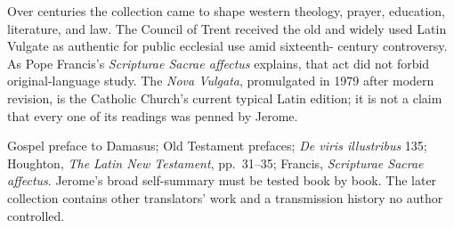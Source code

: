 Over centuries the collection came to shape western theology, prayer,
education, literature, and law. The Council of Trent received the old and
widely used Latin Vulgate as authentic for public ecclesial use amid sixteenth-
century controversy. As Pope Francis's \emph{Scripturae Sacrae affectus}
explains, that act did not forbid original-language study. The \emph{Nova
Vulgata}, promulgated in 1979 after modern revision, is the Catholic Church's
current typical Latin edition; it is not a claim that every one of its readings
was penned by Jerome.

{Gospel preface to Damasus; Old Testament prefaces; \emph{De viris
illustribus} 135; Houghton, \emph{The Latin New Testament}, pp.~31--35;
Francis, \emph{Scripturae Sacrae affectus}.}
{Jerome's broad self-summary must be tested book by book. The later collection
contains other translators' work and a transmission history no author
controlled.}
